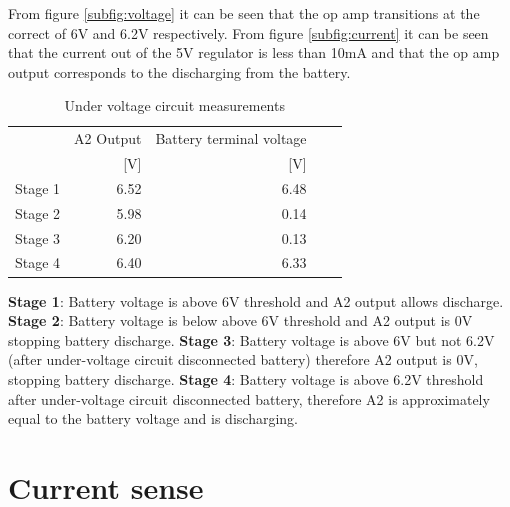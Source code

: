 From figure \ref{subfig:voltage} it can be seen that the op amp transitions at the correct of 6V and 6.2V respectively. From figure \ref{subfig:current} it can be seen that the current out of the 5V regulator is less than 10mA and that the op amp output corresponds to the discharging from the battery. 



\begin{table}[!htb]
	\centering
	\footnotesize
	\caption{Under voltage circuit measurements}
	\begin{tabular}{lrrrr}
		\toprule
		& A2 Output& Battery terminal voltage \\
		&  [V]&[V] \\
		\midrule
		Stage 1 & 6.52 &6.48    \\
		Stage 2 &  5.98&0.14     \\
		Stage 3 &  6.20&0.13     \\
		Stage 4 &  6.40&6.33     \\
		
		\bottomrule
	\end{tabular}
	\label{tab:stagemeas}
\end{table}

\begin{flushleft}
\textbf{Stage 1}: Battery voltage is above 6V threshold and A2 output allows discharge.\newline
\textbf{Stage 2}: Battery voltage is below above 6V threshold and A2 output is 0V stopping battery discharge.\newline
\textbf{Stage 3}: Battery voltage is above 6V but not 6.2V (after under-voltage circuit disconnected battery) therefore A2 output is 0V, stopping battery discharge.\newline
\textbf{Stage 4}: Battery voltage is above 6.2V threshold after under-voltage circuit disconnected battery, therefore A2 is approximately equal to the battery voltage and is discharging.\newline
\end{flushleft}






\section{Current sense}


